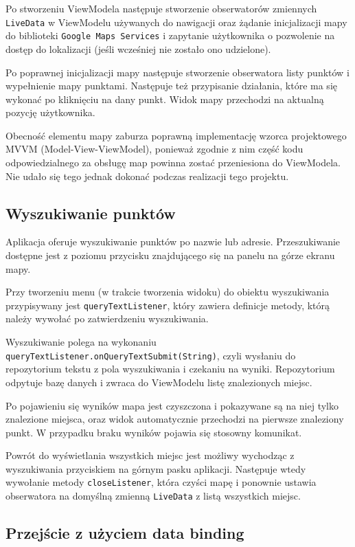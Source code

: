 \documentclass[polish,polish,a4paper,12pt]{article}
\begin{document}
	Po stworzeniu ViewModela następuje stworzenie obserwatorów zmiennych \texttt{LiveData} w ViewModelu używanych do nawigacji oraz żądanie inicjalizacji mapy do biblioteki \texttt{Google Maps Services} i zapytanie użytkownika o pozwolenie na dostęp do lokalizacji (jeśli wcześniej nie zostało ono udzielone).

	Po poprawnej inicjalizacji mapy następuje stworzenie obserwatora listy punktów i wypełnienie mapy punktami. Następuje też przypisanie działania, które ma się wykonać po kliknięciu na dany punkt. Widok mapy przechodzi na aktualną pozycję użytkownika.

	Obecność elementu mapy zaburza poprawną implementację wzorca projektowego MVVM (Model-View-ViewModel), ponieważ zgodnie z nim część kodu odpowiedzialnego za obsługę map powinna zostać przeniesiona do ViewModela. Nie udało się tego jednak dokonać podczas realizacji tego projektu.

	\subsection{Wyszukiwanie punktów}

	Aplikacja oferuje wyszukiwanie punktów po nazwie lub adresie. Przeszukiwanie dostępne jest z poziomu przycisku znajdującego się na panelu na górze ekranu mapy.

	Przy tworzeniu menu (w trakcie tworzenia widoku) do obiektu wyszukiwania przypisywany jest \texttt{queryTextListener}, który zawiera definicje metody, którą należy wywołać po zatwierdzeniu wyszukiwania.

	Wyszukiwanie polega na wykonaniu \texttt{queryTextListener.onQueryTextSubmit(String)}, czyli wysłaniu do repozytorium tekstu z pola wyszukiwania i czekaniu na wyniki. Repozytorium odpytuje bazę danych i zwraca do ViewModelu listę znalezionych miejsc.

	Po pojawieniu się wyników mapa jest czyszczona i pokazywane są na niej tylko znalezione miejsca, oraz widok automatycznie przechodzi na pierwsze znaleziony punkt. W przypadku braku wyników pojawia się stosowny komunikat.

	Powrót do wyświetlania wszystkich miejsc jest możliwy wychodząc z wyszukiwania przyciskiem na górnym pasku aplikacji. Następuje wtedy wywołanie metody \texttt{closeListener}, która czyści mapę i ponownie ustawia obserwatora na domyślną zmienną \texttt{LiveData} z listą wszystkich miejsc.

	\subsection{Przejście z użyciem data binding}\label{navigation}
\end{document}
